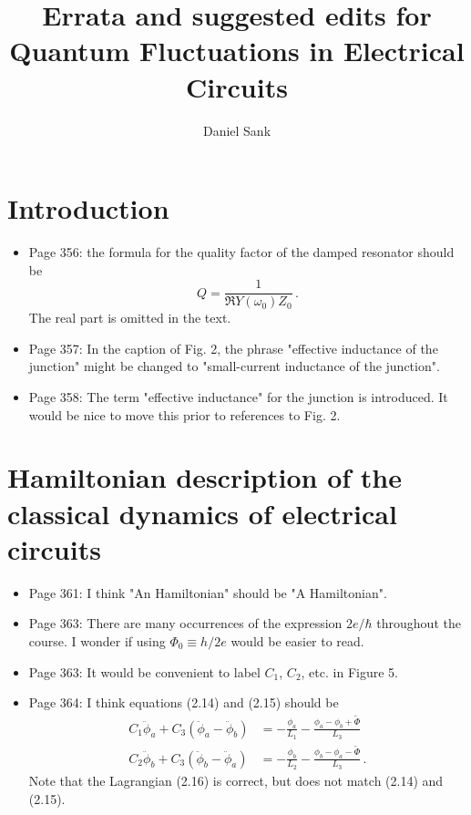 \documentclass{article}
\title{Errata and suggested edits for \\
Quantum Fluctuations in Electrical Circuits}
\author{Daniel Sank}
\begin{document}
\maketitle

\section{Introduction}

\begin{itemize}

\item Page 356: the formula for the quality factor of the damped resonator should be
\begin{equation}
Q = \frac{1}{\Re{Y(\omega_0)} Z_0} \nonumber \, .
\end{equation} 
The real part is omitted in the text.

\item Page 357: In the caption of Fig. 2, the phrase "effective inductance of the junction" might be changed to "small-current inductance of the junction".

\item Page 358: The term "effective inductance" for the junction is introduced. It would be nice to move this prior to references to Fig. 2.

\end{itemize}


\section{Hamiltonian description of the classical dynamics of electrical circuits}

\begin{itemize}

\item Page 361: I think "An Hamiltonian" should be "A Hamiltonian".

\item Page 363: There are many occurrences of the expression $2e / \hbar$ throughout the course. I wonder if using $\Phi_0 \equiv h / 2e$ would be easier to read.

\item Page 363: It would be convenient to label $C_1$, $C_2$, etc. in Figure 5.

\item Page 364: I think equations (2.14) and (2.15) should be
\begin{align}
C_1 \ddot{\phi}_a + C_3 ( \ddot{\phi}_a - \ddot{\phi}_b) &= - \frac{\phi_a}{L_1} - \frac{\phi_a - \phi_b + \tilde{\Phi}}{L_3} \nonumber \\
C_2 \ddot{\phi}_b + C_3 ( \ddot{\phi}_b - \ddot{\phi}_a) &= - \frac{\phi_b}{L_2} - \frac{\phi_b - \phi_a - \tilde{\Phi}}{L_3} \nonumber \, .
\end{align}
Note that the Lagrangian (2.16) is correct, but does not match (2.14) and (2.15).

\end{itemize}
\end{document}
